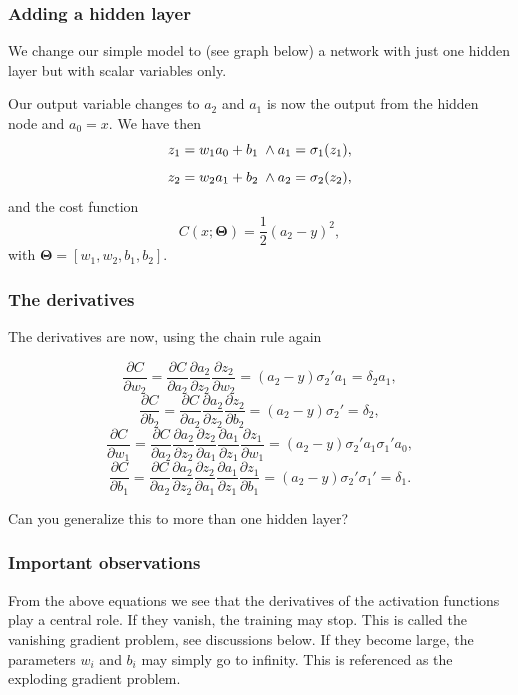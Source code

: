 \documentclass{beamer}
\begin{document}
\begin{frame}
\frametitle{Adding a hidden layer}

We change our simple model to (see graph below)
a network with just one hidden layer but with scalar variables only.

Our output variable changes to $a_2$ and $a_1$ is now the output from the hidden node and $a_0=x$.
We have then
\[
z_1 = w_1a_0+b_1 \hspace{0.1cm} \wedge a_1 = \sigma_1(z_1),
\]
\[
z_2 = w_2a_1+b_2 \hspace{0.1cm} \wedge a_2 = \sigma_2(z_2),
\]
and the cost function
\[
C(x;\bm{\Theta})=\frac{1}{2}(a_2-y)^2,
\]
with $\bm{\Theta}=[w_1,w_2,b_1,b_2]$.
\end{frame}

\begin{frame}
\frametitle{The derivatives}

The derivatives are now, using the chain rule again

\[
\frac{\partial C}{\partial w_2}=\frac{\partial C}{\partial a_2}\frac{\partial a_2}{\partial z_2}\frac{\partial z_2}{\partial w_2}=(a_2-y)\sigma_2'a_1=\delta_2a_1,
\]
\[
\frac{\partial C}{\partial b_2}=\frac{\partial C}{\partial a_2}\frac{\partial a_2}{\partial z_2}\frac{\partial z_2}{\partial b_2}=(a_2-y)\sigma_2'=\delta_2,
\]
\[
\frac{\partial C}{\partial w_1}=\frac{\partial C}{\partial a_2}\frac{\partial a_2}{\partial z_2}\frac{\partial z_2}{\partial a_1}\frac{\partial a_1}{\partial z_1}\frac{\partial z_1}{\partial w_1}=(a_2-y)\sigma_2'a_1\sigma_1'a_0,
\]
\[
\frac{\partial C}{\partial b_1}=\frac{\partial C}{\partial a_2}\frac{\partial a_2}{\partial z_2}\frac{\partial z_2}{\partial a_1}\frac{\partial a_1}{\partial z_1}\frac{\partial z_1}{\partial b_1}=(a_2-y)\sigma_2'\sigma_1'=\delta_1.
\]

Can you generalize this to more than one hidden layer?
\end{frame}

\begin{frame}
\frametitle{Important observations}

\begin{block}{}
From the above equations we see that the derivatives of the activation
functions play a central role. If they vanish, the training may
stop. This is called the vanishing gradient problem, see discussions below. If they become
large, the parameters $w_i$ and $b_i$ may simply go to infinity. This
is referenced as  the exploding gradient problem.
\end{block}
\end{frame}
\end{document}
